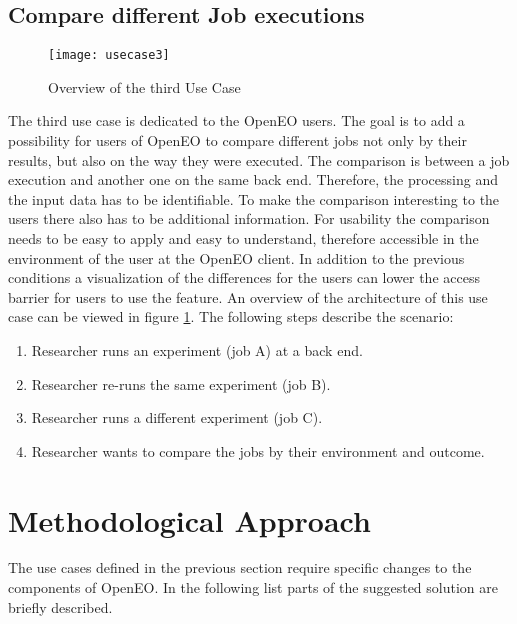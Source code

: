 \documentclass[draft,final]{vutinfth} %
\begin{document}
\subsection{Compare different Job executions}\label{UseCase3}
\begin{figure}[h]
	\centering
	\texttt{[image: usecase3]}
	\caption{Overview of the third Use Case}
	\label{fig:usecase3} %
\end{figure}
The third use case is dedicated to the OpenEO users. The goal is to add a possibility for users of OpenEO to compare different jobs not only by their results, but also on the way they were executed. The comparison is between a job execution and another one on the same back end. Therefore, the processing and the input data has to be identifiable. To make the comparison interesting to the users there also has to be additional information. For usability the comparison needs to be easy to apply and easy to understand, therefore accessible in the environment of the user at the OpenEO client. In addition to the previous conditions a visualization of the differences for the users can lower the access barrier for users to use the feature. An overview of the architecture of this use case can be viewed in figure \ref{fig:usecase3}.
The following steps describe the scenario:
\begin{enumerate}
	\item Researcher runs an experiment (job A) at a back end.
	\item Researcher re-runs the same experiment (job B).
	\item Researcher runs a different experiment (job C).   
	\item Researcher wants to compare the jobs by their environment and outcome.
\end{enumerate}

\section{Methodological Approach}\label{Method}
The use cases defined in the previous section require specific changes to the components of OpenEO. In the following list parts of the suggested solution are briefly described. 
\end{document}
